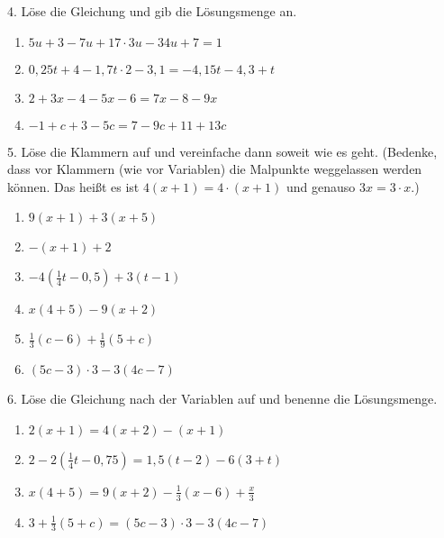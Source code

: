 \documentclass[11pt,a4paper]{scrartcl}
\begin{document}
4. Löse die Gleichung und gib die Lösungsmenge an.
\begin{multicols}{2}
	\begin{enumerate}[label=\alph*)] 
		\item $5u+3-7u+17\cdot 3u - 34u+7 = 1$
		\item $0,25t+4-1,7t\cdot 2 -3,1 = -4,15t-4,3+t$
		\item $2+3x-4-5x-6=7x-8-9x$
		\item $-1+c+3-5c=7-9c+11+13c$
	\end{enumerate}
\end{multicols}

5. Löse die Klammern auf und vereinfache dann soweit wie es geht. (Bedenke, dass vor Klammern (wie vor Variablen) die Malpunkte weggelassen werden können. Das heißt es ist $4(x+1) = 4\cdot (x+1)$ und genauso $3x = 3\cdot x$.)
\begin{multicols}{3}
	\begin{enumerate}[label=\alph*)] 
		\item $9(x+1)+3(x+5)$ \item $-(x+1)+2$ \item $-4(\frac{1}{4}t-0,5)+3(t-1) $
		\item $x(4+5)-9(x+2)$ \item $\frac{1}{3}(c-6)+\frac{1}{9}(5+c)$ \item $(5c-3)\cdot 3 - 3 (4c-7)$
	\end{enumerate}
\end{multicols}

6. Löse die Gleichung nach der Variablen auf und benenne die Lösungsmenge.
\begin{multicols}{2}
	\begin{enumerate}[label=\alph*)] 
		\item $2(x+1)=4(x+2)-(x+1)$ \item $2-2(\frac{1}{4}t-0,75)=1,5(t-2)-6(3+t) $
		\item$x(4+5)=9(x+2)-\frac{1}{3}(x-6)+\frac{x}{3}$\item $3+\frac{1}{3}(5+c)=(5c-3)\cdot 3 - 3 (4c-7)$
	\end{enumerate}
\end{multicols}

\newpage 
\end{document}

